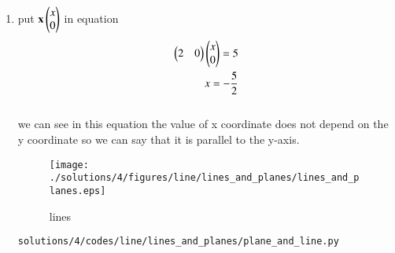 \begin{enumerate}
\item put $\mathbf x \begin{pmatrix}x\\0\end{pmatrix}$ in equation 
\begin{align}
\begin{pmatrix}2 & 0\end{pmatrix}\begin{pmatrix}x\\0\end{pmatrix} = 5
\\
x= -\frac{5}{2}
\end{align}
\\
we can see in this equation the  value of x coordinate does not depend on the y coordinate so we can say that it is parallel to the y-axis.
\begin{figure}[!ht]
	\centering
	\texttt{[image: ./solutions/4/figures/line/lines\_and\_planes/lines\_and\_planes.eps]}
	\caption{lines }
	\label{fig:3.7.4_lines}
\end{figure}
\begin{lstlisting}
solutions/4/codes/line/lines_and_planes/plane_and_line.py
\end{lstlisting} 
\end{enumerate}
